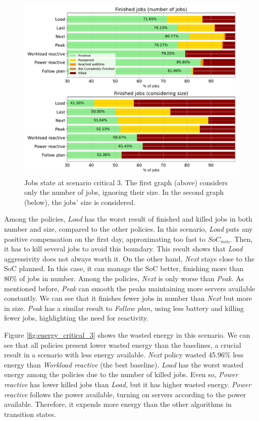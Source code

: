 \begin{figure}[!htb]
    \centering
    \includegraphics[scale=0.55]{Images/Compensations/jobs_critical_3.pdf}
    \caption[Jobs state at scenario critical 3.]{Jobs state at scenario critical 3. The first graph (above) considers only the number of jobs, ignoring their size. In the second graph (below), the jobs' size is considered.}
    \label{fig:jobs_critical_3}
\end{figure}

Among the policies, \emph{Load} has the worst result of finished and killed jobs in both number and size, compared to the other policies. In this scenario, \emph{Load} puts any positive compensation on the first day, approximating too fast to $SoC_{min}$. Then, it has to kill several jobs to avoid this boundary. This result shows that \emph{Load} aggressivity does not always worth it. On the other hand, \emph{Next} stays close to the SoC planned. In this case, it can manage the SoC better, finishing more than 80\% of jobs in number. Among the policies, \emph{Next} is only worse than \emph{Peak}. As mentioned before, \emph{Peak} can smooth the peaks maintaining more servers available constantly. We can see that it finishes fewer jobs in number than \emph{Next} but more in size. \emph{Peak} has a similar result to \emph{Follow plan}, using less battery and killing fewer jobs, highlighting the need for reactivity.

Figure \ref{fig:energy_critical_3} shows the wasted energy in this scenario. We can see that all policies present lower wasted energy than the baselines, a crucial result in a scenario with less energy available. \emph{Next} policy wasted 45.96\% less energy than \emph{Workload reactive} (the best baseline). \emph{Load} has the worst wasted energy among the policies due to the number of killed jobs. Even so, \emph{Power reactive} has lower killed jobs than \emph{Load}, but it has higher wasted energy. \emph{Power reactive} follows the power available, turning on servers according to the power available. Therefore, it expends more energy than the other algorithms in transition states.

